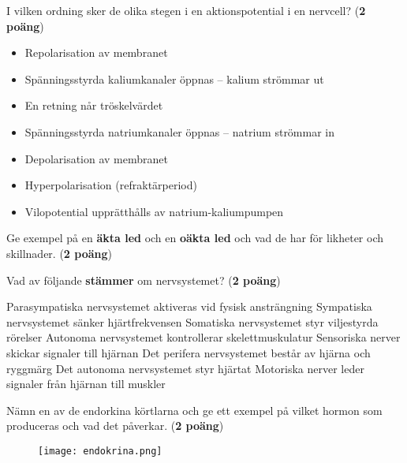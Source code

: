 \documentclass{exam}
\begin{document}
\vspace{5mm} %
\begin{center}
\end{center}
\begin{questions}

\question I vilken ordning sker de olika stegen i en aktionspotential i en nervcell? (\textbf{2 poäng})

\begin{itemize}
  \item Repolarisation av membranet
  \item Spänningsstyrda kaliumkanaler öppnas – kalium strömmar ut
  \item En retning når tröskelvärdet
  \item Spänningsstyrda natriumkanaler öppnas – natrium strömmar in
  \item Depolarisation av membranet
  \item Hyperpolarisation (refraktärperiod)
  \item Vilopotential upprätthålls av natrium-kaliumpumpen
\end{itemize}

\vspace{5mm} %

\question Ge exempel på en \textbf{äkta led} och en \textbf{oäkta led} och vad de har för likheter och skillnader. (\textbf{2 poäng})
\vspace{40mm}

\question Vad av följande \textbf{stämmer} om nervsystemet? (\textbf{2 poäng})
\begin{checkboxes}
    \choice Parasympatiska nervsystemet aktiveras vid fysisk ansträngning
    \choice Sympatiska nervsystemet sänker hjärtfrekvensen
    \choice Somatiska nervsystemet styr viljestyrda rörelser
    \choice Autonoma nervsystemet kontrollerar skelettmuskulatur
    \choice Sensoriska nerver skickar signaler till hjärnan
    \choice Det perifera nervsystemet består av hjärna och ryggmärg
    \choice Det autonoma nervsystemet styr hjärtat
    \choice Motoriska nerver leder signaler från hjärnan till muskler
\end{checkboxes}

\break
\question Nämn en av de endorkina körtlarna och ge ett exempel på vilket hormon som produceras och vad det påverkar. (\textbf{2 poäng})
\begin{figure}[h]
\texttt{[image: endokrina.png]}
\end{figure}
\vspace{5mm}


\end{questions}
\end{document}
